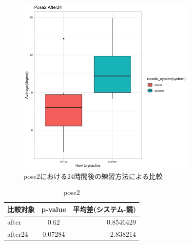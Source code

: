       \begin{figure}[H]
        \begin{center}
        \includegraphics[width=9cm]{figures/pose2_after24_boxplot.png}
        \caption{pose2における24時間後の練習方法による比較}
        \label{fig:pose2_after24_practice}
        \end{center}
      \end{figure}

      \begin{table}[H]
        \centering
        \caption{pose2}
        \begin{tabular}{lcr}
        \hline
        \textbf{比較対象} & \textbf{p-value} & \textbf{平均差(システム-鏡)} \\ \hline
        after & 0.62 & 0.8546429 \\ \hline
        after24 & 0.07284 & 2.838214 \\ \hline
        \end{tabular}
        \label{table:pose2_practice_p_value}
        \end{table}


